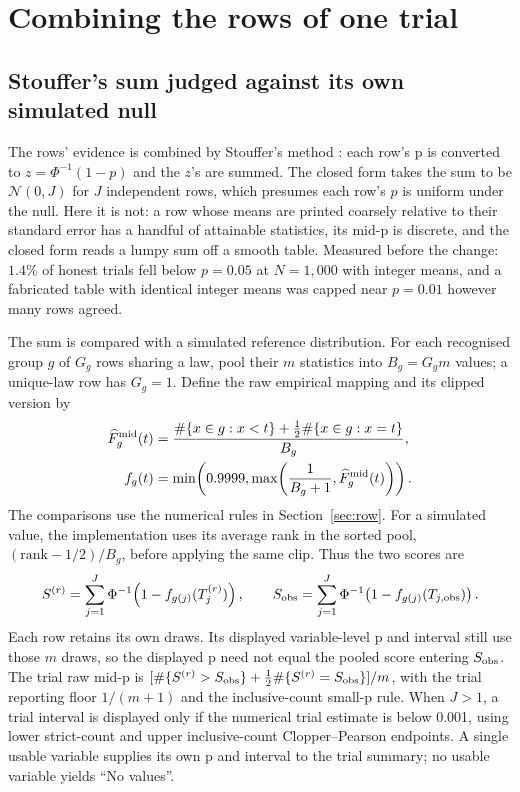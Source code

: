 \documentclass[11pt,a4paper]{article}
\begin{document}
\section{Combining the rows of one trial}
\label{sec:trial}

\subsection{Stouffer's sum judged against its own simulated null}

The rows' evidence is combined by Stouffer's method \citep{stouffer1949,liptak1958}: each row's p is converted to $z = \Phi^{-1}(1 - p)$ and the $z$'s are summed. The closed form takes the sum to be $\mathcal{N}(0, J)$ for $J$ independent rows, which presumes each row's $p$ is uniform under the null. Here it is not: a row whose means are printed coarsely relative to their standard error has a handful of attainable statistics, its mid-p is discrete, and the closed form reads a lumpy sum off a smooth table. Measured before the change: $1.4\%$ of honest trials fell below $p = 0.05$ at $N = 1{,}000$ with integer means, and a fabricated table with identical integer means was capped near $p = 0.01$ however many rows agreed.

The sum is compared with a simulated reference distribution. For each recognised group $g$ of $G_g$ rows sharing a law, pool their $m$ statistics into $B_g=G_gm$ values; a unique-law row has $G_g=1$. Define the raw empirical mapping and its clipped version by
\begin{align}
\widehat F^{\rm mid}_g(t)&=\frac{\#\{x\in g:x<t\}+\tfrac12\#\{x\in g:x=t\}}{B_g},\\
f_g(t)&=\min\!\left(0.9999,\max\!\left(\frac{1}{B_g+1},\widehat F^{\rm mid}_g(t)\right)\right).
\end{align}
The comparisons use the numerical rules in Section~\ref{sec:row}. For a simulated value, the implementation uses its average rank in the sorted pool, $(\mathrm{rank}-1/2)/B_g$, before applying the same clip. Thus the two scores are
\begin{equation}
S^{(r)}=\sum_{j=1}^{J}\Phi^{-1}\!\left(1-f_{g(j)}(T_j^{(r)})\right),\qquad
S_{\rm obs}=\sum_{j=1}^{J}\Phi^{-1}\!\left(1-f_{g(j)}(T_{j,\rm obs})\right).
\end{equation}
Each row retains its own draws. Its displayed variable-level p and interval still use those $m$ draws, so the displayed p need not equal the pooled score entering $S_{\rm obs}$. The trial raw mid-p is $[\#\{S^{(r)}>S_{\rm obs}\}+\tfrac12\#\{S^{(r)}=S_{\rm obs}\}]/m$, with the trial reporting floor $1/(m+1)$ and the inclusive-count small-p rule. When $J>1$, a trial interval is displayed only if the numerical trial estimate is below 0.001, using lower strict-count and upper inclusive-count Clopper--Pearson endpoints. A single usable variable supplies its own p and interval to the trial summary; no usable variable yields ``No values''.
\end{document}
